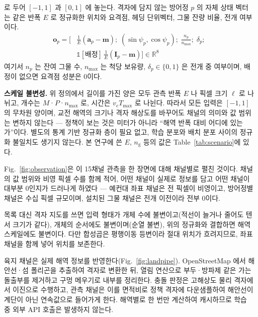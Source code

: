 로 두어 $[-1,1]$ 과 $[0,1]$ 에 놓는다. 격자에 담지 않는 방어정 $p$ 의 자체 상태 벡터는
같은 반폭 $E$ 로 정규화한 위치와 요격점, 헤딩 단위벡터, 그물 잔량 비율, 전개 여부이다.
\begin{equation}
\begin{aligned}
\mathbf{o}_p = \Big[&\tfrac{1}{E}(\mathbf{a}_p - \mathbf{m});\; (\sin\psi_p, \cos\psi_p);\;
  \tfrac{n_p}{n_{\max}};\; \delta_p;\\
  &\mathbb{1}[\text{배정}]\,\tfrac{1}{E}(\mathbf{I}_p - \mathbf{m})\Big] \in \mathbb{R}^{8}
\end{aligned}
\label{eq:own}
\end{equation}
여기서 $n_p$ 는 잔여 그물 수, $n_{\max}$ 는 척당 보유량, $\delta_p \in \{0,1\}$ 은 전개 중
여부이며, 배정이 없으면 요격점 성분은 0이다.

\textbf{스케일 불변성.} 위 정의에서 길이를 가진 양은 모두 관측 반폭 $E$ 나 픽셀 크기 $\ell$
로 나뉘고, 개수는 $M$·$P$·$n_{\max}$ 로, 시간은 $v_e T_{\max}$ 로 나뉜다. 따라서 모든
입력은 $[-1,1]$ 의 무차원 양이며, 교전 해역의 크기나 격자 해상도를 바꾸어도 채널의 의미와
값 범위는 변하지 않는다 --- 정책이 보는 것은 미터가 아니라 ``해역 반폭 대비 어디에
있는가''이다. 별도의 통계 기반 정규화 층이 필요 없고, 학습 분포와 배치 분포 사이의 정규화
불일치도 생기지 않는다. 본 연구에 쓴 $E$, $n_{\mathrm{g}}$ 등의 값은
Table~\ref{tab:scenario}에 있다.

Fig.~\ref{fig:observation}은 이 15채널 관측을 한 장면에 대해 채널별로 펼친 것이다.
채널의 값 범위와 비영 픽셀 수를 함께 적어, 어떤 채널이 실제로 정보를 담고 어떤 채널이
대부분 0인지가 드러나게 하였다 --- 예컨대 좌표 채널은 전 픽셀이 비영이고, 방어정별 채널은
수십 픽셀 규모이며, 설치된 그물 채널은 전개 이전이라 전부 0이다.

목록 대신 격자 지도를 쓰면 입력 형태가 개체 수에 불변이고(적선이 늘거나 줄어도 텐서 크기가
같다), 개체의 순서에도 불변이며(순열 불변), 위의 정규화와 결합하면 해역 스케일에도 불변이다.
다만 합성곱은 평행이동 등변이라 절대 위치가 흐려지므로, 좌표 채널을 함께 넣어 위치를
보존한다.

육지 채널은 실제 해역 정보를 반영한다(Fig.~\ref{fig:landpipe}). OpenStreetMap 에서 해안선·섬 폴리곤을 추출하여
격자로 변환한 뒤, 열림 연산으로 부두·방파제 같은 가는 돌출부를 제거하고 구멍 메우기로
내부를 정리한다. 충돌 판정은 고해상도 물리 격자에서 이진으로 수행하고, 관측 채널은 이를
면적비로 정책 격자에 다운샘플하여 해안선이 계단이 아닌 연속값으로 들어가게 한다.
해역별로 한 번만 계산하여 캐시하므로 학습 중 외부 API 호출은 발생하지 않는다.

